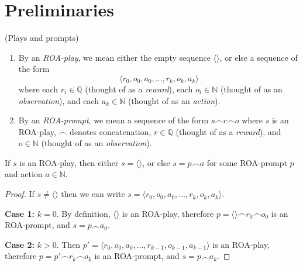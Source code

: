 \documentclass[runningheads]{llncs}
\begin{document}
\section{Preliminaries}

\begin{definition}
(Plays and prompts)
    \begin{enumerate}
        \item
        By an \emph{ROA-play}, we mean either the empty sequence $\langle\rangle$,
        or else a sequence of the form
        \[
            \langle r_0,o_0,a_0,\ldots,r_k,o_k,a_k\rangle
        \]
        where each $r_i\in\mathbb Q$ (thought of as a \emph{reward}),
        each $o_i\in\mathbb N$ (thought of as an \emph{observation}),
        and each $a_k\in \mathbb N$ (thought of as an \emph{action}).
        \item
        By an \emph{ROA-prompt}, we mean a sequence of the form
        $s\frown r\frown o$
        where $s$ is an ROA-play, $\frown$ denotes concatenation,
        $r\in\mathbb Q$ (thought of as a \emph{reward}),
        and $o\in\mathbb N$ (thought of as an \emph{observation}).
    \end{enumerate}
\end{definition}

\begin{lemma}
\label{roaplaydecompositionlemma}
    If $s$ is an ROA-play, then either $s=\langle\rangle$, or else
    $s=p\frown a$ for some ROA-prompt $p$ and action $a\in\mathbb N$.
\end{lemma}

\begin{proof}
    If $s\not=\langle\rangle$ then we can write
    $s=\langle r_0,o_0,a_0,\ldots,r_k,o_k,a_k \rangle$.

    \textbf{Case 1:}
    $k=0$. By definition, $\langle\rangle$ is an ROA-play,
    therefore $p=\langle\rangle\frown r_0\frown o_0$ is an ROA-prompt,
    and $s=p\frown a_0$.

    \textbf{Case 2:} $k>0$.
    Then $p'=\langle r_0,o_0,a_0,\ldots,r_{k-1},o_{k-1},a_{k-1}\rangle$ is an ROA-play,
    therefore $p=p'\frown r_k\frown o_k$ is an ROA-prompt,
    and $s=p\frown a_k$.
\end{proof}
\end{document}
